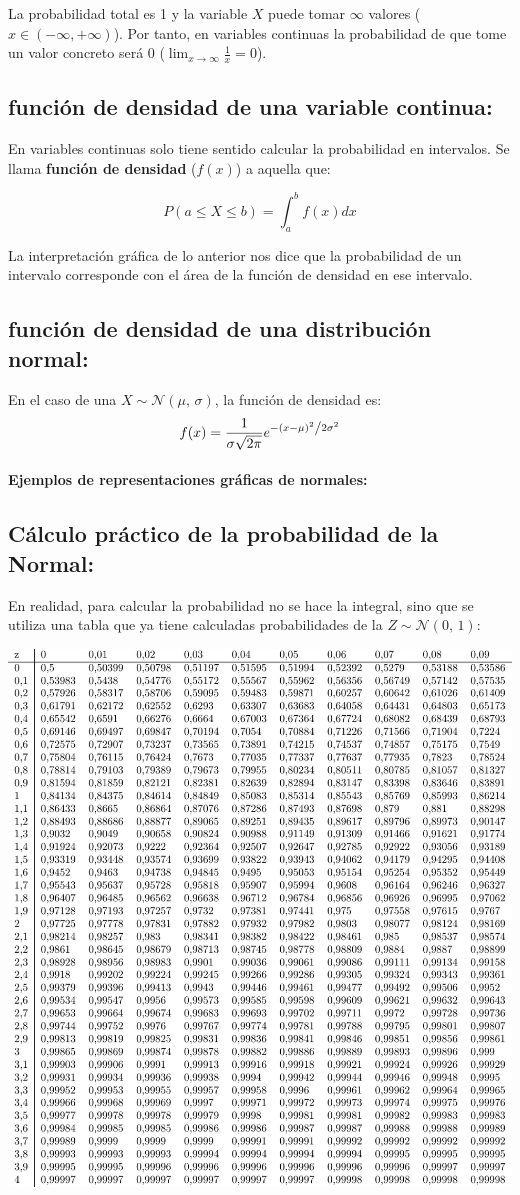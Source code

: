 La probabilidad total es 1 y la variable $X$ puede tomar $\infty$ valores ($x \in \left(-\infty, +\infty\right)$). Por tanto, en variables continuas la probabilidad de que tome un valor concreto será 0 ($\lim_{x \to \infty}\frac{1}{x}=0$).    

\subsection{función de densidad de una variable continua:}  En variables continuas solo tiene sentido calcular la probabilidad en intervalos.
Se llama \textbf{función de densidad} ($f(x)$) a aquella que: 

$$P\left(a\leq X \leq b \right) = \int_{a}^{b} f(x) dx$$

La interpretación gráfica de lo anterior nos dice que la probabilidad de un intervalo corresponde con el área de la función de densidad en ese intervalo.



\subsection{función de densidad de una distribución normal:}  En el caso de una $
X \sim \mathcal{N}(\mu,\,\sigma)
    $, la función de densidad es:
    $$f(x)=\frac{1}{{\sigma \sqrt {2\pi } }}e^{{{ - \left( {x - \mu } \right)^2 } \mathord{\left/ {\vphantom {{ - \left( {x - \mu } \right)^2 } {2\sigma ^2 }}} \right. \kern-\nulldelimiterspace} {2\sigma ^2 }}}$$
\paragraph{Ejemplos de representaciones gráficas de normales:} 


\subsection{Cálculo práctico de la probabilidad de la Normal:} En realidad, para calcular la probabilidad no se hace la integral, sino que se utiliza una tabla que ya tiene calculadas probabilidades de la  $Z \sim \mathcal{N}(0,\,1)
    $:
    
\includegraphics[page=1,width=.45\textwidth]{probabilidad/distribucion_normal}

